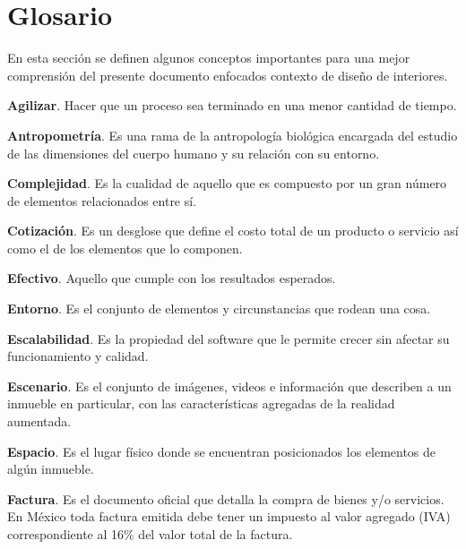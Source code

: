 \chapter{Glosario}
En esta sección se definen algunos conceptos importantes para una mejor comprensión del presente documento enfocados contexto de diseño de interiores.\par
\vspace{10mm}

\noindent
\textbf{Agilizar}. Hacer que un proceso sea terminado en una menor cantidad de tiempo.\par
\vspace{2mm}
\noindent
\textbf{Antropometría}. Es una rama de la antropología biológica encargada del estudio de las dimensiones del cuerpo humano y su relación con su entorno.\par
\vspace{2mm}
\noindent
\textbf{Complejidad}. Es la cualidad de aquello que es compuesto por un gran número de elementos relacionados entre sí.\par
\vspace{2mm}
\noindent
\textbf{Cotización}. Es un desglose que define el costo total de un producto o servicio así como el de los elementos que lo componen.\par
\vspace{2mm}
\noindent
\textbf{Efectivo}. Aquello que cumple con los resultados esperados.\par
\vspace{2mm}
\noindent
\textbf{Entorno}. Es el conjunto de elementos y circunstancias que rodean una cosa.\par
\vspace{2mm}
\noindent
\textbf{Escalabilidad}. Es la propiedad del software que le permite crecer sin afectar su funcionamiento y calidad.\par
\vspace{2mm}
\noindent
\textbf{Escenario}. Es el conjunto de imágenes, videos e información que describen a un inmueble en particular, con las características agregadas de la realidad aumentada.\par
\vspace{2mm}
\noindent
\textbf{Espacio}. Es el lugar físico donde se encuentran posicionados los elementos de algún inmueble.\par
\vspace{2mm}
\noindent
\textbf{Factura}. Es el documento oficial que detalla la compra de bienes y/o servicios. En México toda factura emitida debe tener un impuesto al valor agregado (IVA) correspondiente al 16\% del valor total de la factura.\par
